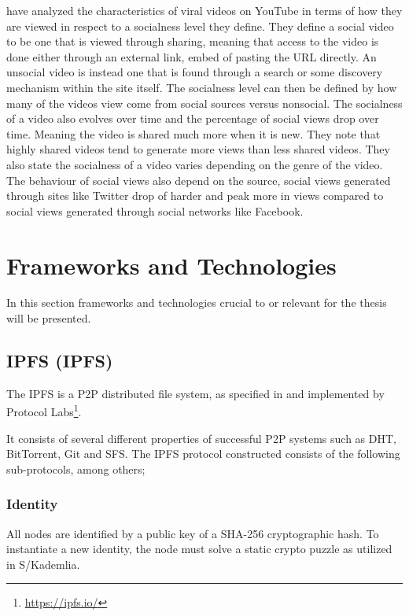 \citeauthor{broxton2013catching} \cite{broxton2013catching} have analyzed the characteristics of viral videos on YouTube in terms of how they are viewed in respect to a socialness level they define. They define a social video to be one that is viewed through sharing, meaning that access to the video is done either through an external link, embed of pasting the URL directly. An unsocial video is instead one that is found through a search or some discovery mechanism within the site itself. The socialness level can then be defined by how many of the videos view come from social sources versus nonsocial. The socialness of a video also evolves over time and the percentage of social views drop over time. Meaning the video is shared much more when it is new. They note that highly shared videos tend to generate more views than less shared videos. They also state the socialness of a video varies depending on the genre of the video. The behaviour of social views also depend on the source, social views generated through sites like Twitter drop of harder and peak more in views compared to social views generated through social networks like Facebook.


\section{Frameworks and Technologies}
\label{sec:fram-techn}
In this section frameworks and technologies crucial to or relevant for the thesis will be presented.

\subsection{\acl{IPFS} (\acs{IPFS})}
The \acs{IPFS} is a \acs{P2P} distributed file system, as specified in \cite{benet2014ipfs} and implemented by Protocol Labs\footnote{\url{https://ipfs.io/}}.

It consists of several different properties of successful \acs{P2P} systems such as \acs{DHT}, BitTorrent, Git and \ac{SFS}. The \acs{IPFS} protocol constructed consists of the following sub-protocols, among others;

\subsubsection{Identity}
All nodes are identified by a public key of a SHA-256 cryptographic hash. To instantiate a new identity, the node must solve a static crypto puzzle as utilized in S/Kademlia\cite{baumgart2007skademlia}.

